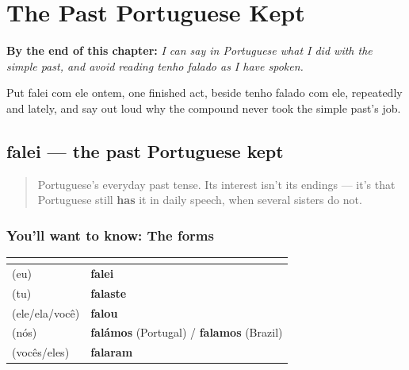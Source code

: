 
\chapter{The Past Portuguese Kept}
\label{ch:pt-past-portuguese-kept}

\begin{chapteropening}
\textbf{By the end of this chapter:} \emph{I can say in Portuguese what I did with the simple past, and avoid reading tenho falado as I have spoken.}

Put falei com ele ontem, one finished act, beside tenho falado com ele, repeatedly and lately, and say out loud why the compound never took the simple past's job.
\end{chapteropening}

\section[falei]{falei — the past Portuguese kept}

\label{lesson:PT-C15-preterito-perfeito}



\begin{quote}
Portuguese's everyday past tense. Its interest isn't its endings — it's that Portuguese still \textbf{has} it in daily speech, when several sisters do not.
\end{quote}

\subsection*{You'll want to know: The forms}
\noindent
\begin{tabularx}{\linewidth}{@{}>{\raggedright\arraybackslash}X>{\raggedright\arraybackslash}X@{}}
\toprule
\textbf{} & \textbf{} \\
\midrule
(eu) & \textbf{falei} \\
(tu) & \textbf{falaste} \\
(ele/ela/você) & \textbf{falou} \\
(nós) & \textbf{falámos} (Portugal) / \textbf{falamos} (Brazil) \\
(vocês/eles) & \textbf{falaram} \\
\bottomrule
\end{tabularx}

